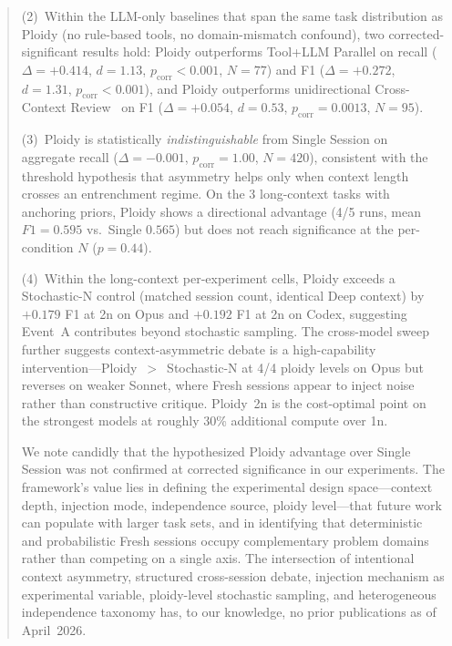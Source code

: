 \documentclass[11pt]{article}
\begin{document}
\begin{abstract}
\noindent (2)~Within the LLM-only baselines that span the same task distribution as Ploidy (no rule-based tools, no domain-mismatch confound), two corrected-significant results hold: Ploidy outperforms Tool+LLM Parallel on recall ($\Delta = +0.414$, $d = 1.13$, $p_\text{corr} < 0.001$, $N = 77$) and F1 ($\Delta = +0.272$, $d = 1.31$, $p_\text{corr} < 0.001$), and Ploidy outperforms unidirectional Cross-Context Review~\citep{song2026ccr} on F1 ($\Delta = +0.054$, $d = 0.53$, $p_\text{corr} = 0.0013$, $N = 95$).

\noindent (3)~Ploidy is statistically \emph{indistinguishable} from Single Session on aggregate recall ($\Delta = -0.001$, $p_\text{corr} = 1.00$, $N = 420$), consistent with the threshold hypothesis that asymmetry helps only when context length crosses an entrenchment regime. On the 3 long-context tasks with anchoring priors, Ploidy shows a directional advantage (4/5 runs, mean $F1 = 0.595$ vs.\ Single $0.565$) but does not reach significance at the per-condition $N$ ($p = 0.44$).

\noindent (4)~Within the long-context per-experiment cells, Ploidy exceeds a Stochastic-N control (matched session count, identical Deep context) by $+0.179$ F1 at 2n on Opus and $+0.192$ F1 at 2n on Codex, suggesting Event~A contributes beyond stochastic sampling. The cross-model sweep further suggests context-asymmetric debate is a high-capability intervention---Ploidy~$>$~Stochastic-N at 4/4 ploidy levels on Opus but reverses on weaker Sonnet, where Fresh sessions appear to inject noise rather than constructive critique. Ploidy~2n is the cost-optimal point on the strongest models at roughly 30\% additional compute over 1n.

\noindent We note candidly that the hypothesized Ploidy advantage over Single Session was not confirmed at corrected significance in our experiments. The framework's value lies in defining the experimental design space---context depth, injection mode, independence source, ploidy level---that future work can populate with larger task sets, and in identifying that deterministic and probabilistic Fresh sessions occupy complementary problem domains rather than competing on a single axis. The intersection of intentional context asymmetry, structured cross-session debate, injection mechanism as experimental variable, ploidy-level stochastic sampling, and heterogeneous independence taxonomy has, to our knowledge, no prior publications as of April~2026.
\end{abstract}
\end{document}
